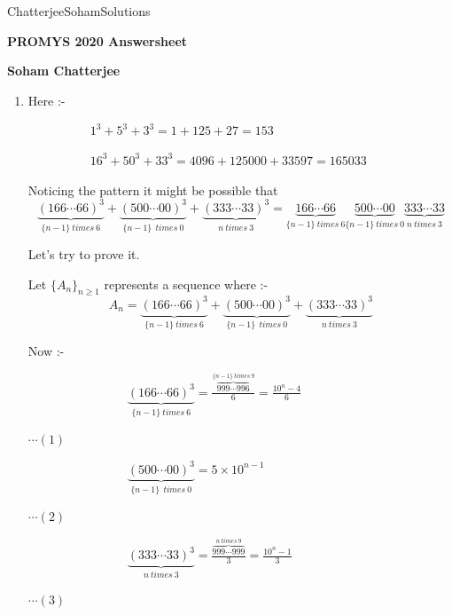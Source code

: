 \documentclass{article}
\begin{document}
\begin{center}
\vspace*{\fill}
\Huge{Chatterjee\textunderscore Soham\textunderscore Solutions}
\vspace*{\fill}


\pagebreak

    \Large{\textbf{PROMYS 2020 Answersheet}}
    
    \Large{\textbf{Soham Chatterjee}}
\end{center}

\begin{enumerate}
     

\item Here :-

\ \ \ \ \ \ \ \ \ \ $ 1^3 + 5^3 + 3^3 = 1 + 125 + 27 = 153$

\ \ \ \ \ \ \ \ \ \ $16^3 + 50^3 + 33^3 = 4096 + 125000 + 33597 = 165033$
    
Noticing the pattern it might be possible that $$\underbrace {(166\cdots 66)^3}_{\{ n-1 \} \ times \ 6} + \underbrace{(500\cdots 00)^3}_{\{ n-1\} \ \ times \ 0} + \underbrace{(333\cdots 33 )^3}_{n \ times \ 3}=\underbrace{166\cdots 66}_{\{ n-1\} \ times \ 6}\underbrace{500\cdots 00}_{\{ n-1\} \ times \ 0}\underbrace{333\cdots33}_{n \ times \ 3}$$

Let's try to prove it.

Let $\{ A_n \}_{n \geq 1}$ represents a sequence where :- $$A_n = \underbrace {(166\cdots 66)^3}_{\{ n-1 \} \ times \ 6} + \underbrace{(500\cdots 00)^3}_{\{ n-1\} \ \ times \ 0} + \underbrace{(333\cdots 33 )^3}_{n \ times \ 3}$$
 
Now :-



\ \ \ \ \ \ \ \ \ \ \ \ \ \ \ \  $ \displaystyle{\underbrace {(166\cdots 66)^3}_{\{ n-1 \} \ times \ 6} = \frac {\overbrace {999 \cdots 996}^{\{ n-1 \} \ times \ 9}}{6} = \frac {10^n - 4}{6}}$ \begin{flushright} $\cdots (1)$ \end{flushright}

\ \ \ \ \ \ \ \ \ \ \ \ \ \ \ \ $ \displaystyle{\underbrace{(500\cdots 00)^3}_{\{ n-1\} \ \ times \ 0} = 5\times 10^{n-1}}$ \begin{flushright} $\cdots (2)$ \end{flushright}

\ \ \ \ \ \ \ \ \ \ \ \ \ \ \ \  $ \displaystyle{\underbrace{(333\cdots 33 )^3}_{n \ times \ 3} = \frac {\overbrace {999 \cdots 999}^{n \ times \ 9}}{3}  = \frac {10^n-1}{3}}$ \begin{flushright} $\cdots (3)$ \end{flushright}


\end{enumerate}
\end{document}
